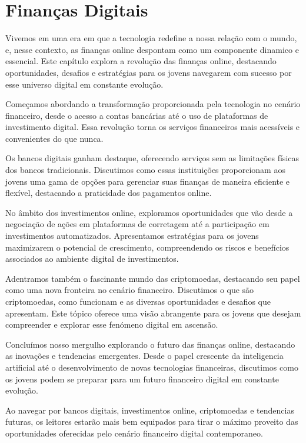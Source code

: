 \documentclass{report}
\begin{document}
\chapter{Finanças Digitais}
\label{chap.analise}

Vivemos em uma era em que a tecnologia redefine a nossa relação com o mundo, e, nesse contexto, as finanças online despontam como um componente dinamico e essencial. Este capítulo explora a revolução das finanças online, destacando oportunidades, desafios e estratégias para os jovens navegarem com sucesso por esse universo digital em constante evolução.

Começamos abordando a transformação proporcionada pela tecnologia no cenário financeiro, desde o acesso a contas bancárias até o uso de plataformas de investimento digital. Essa revolução torna os serviços financeiros mais acessíveis e convenientes do que nunca.

Os bancos digitais ganham destaque, oferecendo serviços sem as limitações físicas dos bancos tradicionais. Discutimos como essas instituições proporcionam aos jovens uma gama de opções para gerenciar suas finanças de maneira eficiente e flexível, destacando a praticidade dos pagamentos online.

No âmbito dos investimentos online, exploramos oportunidades que vão desde a negociação de ações em plataformas de corretagem até a participação em investimentos automatizados. Apresentamos estratégias para os jovens maximizarem o potencial de crescimento, compreendendo os riscos e benefícios associados ao ambiente digital de investimentos.

Adentramos também o fascinante mundo das criptomoedas, destacando seu papel como uma nova fronteira no cenário financeiro. Discutimos o que são criptomoedas, como funcionam e as diversas oportunidades e desafios que apresentam. Este tópico oferece uma visão abrangente para os jovens que desejam compreender e explorar esse fenómeno digital em ascensão.

Concluímos nosso mergulho explorando o futuro das finanças online, destacando as inovações e tendencias emergentes. Desde o papel crescente da inteligencia artificial até o desenvolvimento de novas tecnologias financeiras, discutimos como os jovens podem se preparar para um futuro financeiro digital em constante evolução.

Ao navegar por bancos digitais, investimentos online, criptomoedas e tendencias futuras, os leitores estarão mais bem equipados para tirar o máximo proveito das oportunidades oferecidas pelo cenário financeiro digital contemporaneo.
\end{document}
